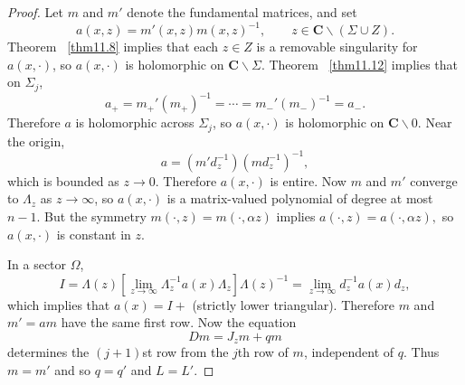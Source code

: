 \documentclass{surv-l}
\theoremstyle{plain}
\theoremstyle{definition}
\numberwithin{equation}{chapter}
\begin{document}
\begin{proof}
Let $m$ and $m'$ denote the fundamental matrices, and set
\begin{equation*}
a(x, z)=m'(x, z)m(x, z)^{-1},\qquad z \in \mathbf{C}\backslash (\Sigma\cup Z).
\end{equation*}
Theorem ~\ref{thm11.8} implies that each $z\in Z$ is a removable singularity for $a(x, \cdot)$, so $a(x, \cdot)$ is holomorphic on $ \textbf{C}\backslash \Sigma$. Theorem ~\ref{thm11.12} implies that on $\Sigma_{j}$,
\begin{equation*}
a_{+}=m_{+}'(m_{+})^{-1}=\cdots =m_{-}'(m_{-})^{-1}=a_{-}.
\end{equation*}
Therefore $a$ is holomorphic across $\Sigma_{j}$, so $a(x, \cdot)$ is holomorphic on $\textbf{C}\backslash 0$. Near the origin,
\begin{equation*}
a=(m'd_{z}^{-1})(md_{z}^{-1})^{-1},
\end{equation*}
which is bounded as $z\rightarrow 0$. Therefore $a(x, \cdot)$ is entire. Now $m$ and $m'$ converge to $\Lambda_{z}$ as $ z\rightarrow\infty$, so $a(x, \cdot)$ is a matrix-valued polynomial of degree at most $n -1$. But the symmetry $m(\cdot, z)=m(\cdot, \alpha z)$ implies $a(\cdot,z) =a(\cdot, \alpha z),$ so $a(x, \cdot)$ is constant in $z$.

In a sector $\Omega$,
\begin{equation*}
I=\Lambda(z)\left[\lim_{z\rightarrow\infty}\Lambda_{z}^{-1}a(x)\Lambda_{z}\right]\Lambda(z)^{-1}=\lim_{z\rightarrow\infty}d_{z}^{-1}a(x)d_{z},
\end{equation*}
which implies that $a(x) =I+$ (strictly lower triangular). Therefore $m$ and $m'=am$ have the same first row. Now the equation
\begin{equation*}
Dm=J_{z}m+qm
\end{equation*}
determines the $(j+1)$st row from the $j$th row of $m$, independent of $q$. Thus $m=m'$ and so $q=q'$ and $L=L'.$
\end{proof}
\end{document}
